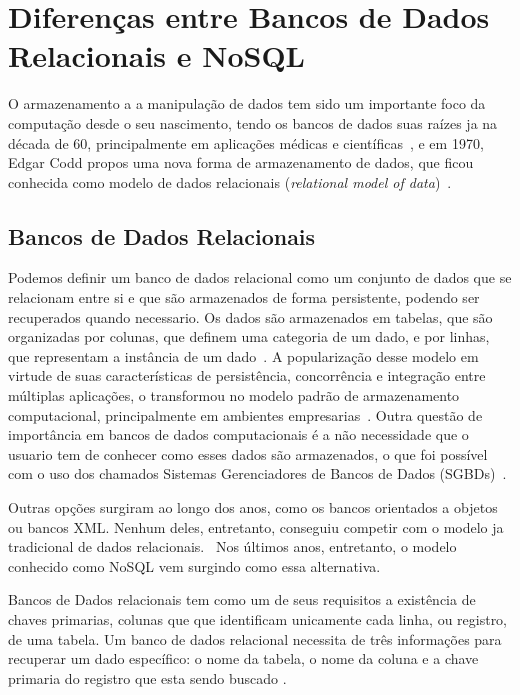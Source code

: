 \chapter{Diferenças entre Bancos de Dados Relacionais e NoSQL}

O armazenamento a a manipulação de dados tem sido um importante foco da computação desde o seu nascimento, tendo os bancos de dados suas raízes ja na década de 60, principalmente em aplicações médicas e científicas~\cite{neufeld1986database}, e em 1970, Edgar Codd propos uma nova forma de armazenamento de dados, que ficou conhecida como modelo de dados relacionais (\emph{relational model of data})~\cite{codd1970relational}. 

\section{Bancos de Dados Relacionais}
    Podemos definir um banco de dados relacional como um conjunto de dados que se relacionam entre si e que são armazenados de forma persistente, podendo ser recuperados quando necessario. Os dados são armazenados em tabelas, que são organizadas por colunas, que definem uma categoria de um dado, e por linhas, que representam a instância de um dado~\cite{leavitt2010nosql}. A popularização desse modelo em virtude de suas características de persistência, concorrência e integração entre múltiplas aplicações, o transformou no modelo padrão de armazenamento computacional, principalmente em ambientes empresarias~\cite{pramod}. Outra questão de importância em bancos de dados computacionais é a não necessidade que o usuario tem de conhecer como esses dados são armazenados, o que foi possível com o uso dos chamados Sistemas Gerenciadores de Bancos de Dados (SGBDs)~\cite{jan}.
    
    Outras opções surgiram ao longo dos anos, como os bancos orientados a objetos ou bancos XML. Nenhum deles, entretanto, conseguiu competir com o modelo ja tradicional de dados relacionais.~\cite{pramod} Nos últimos anos, entretanto, o modelo conhecido como NoSQL vem surgindo como essa alternativa.
    
    Bancos de Dados relacionais tem como um de seus requisitos a existência de chaves primarias, colunas que que identificam unicamente cada linha, ou registro, de uma tabela. Um banco de dados relacional necessita de três informações para recuperar um dado específico: o nome da tabela, o nome da coluna e a chave primaria do registro que esta sendo buscado \cite{jan}.

